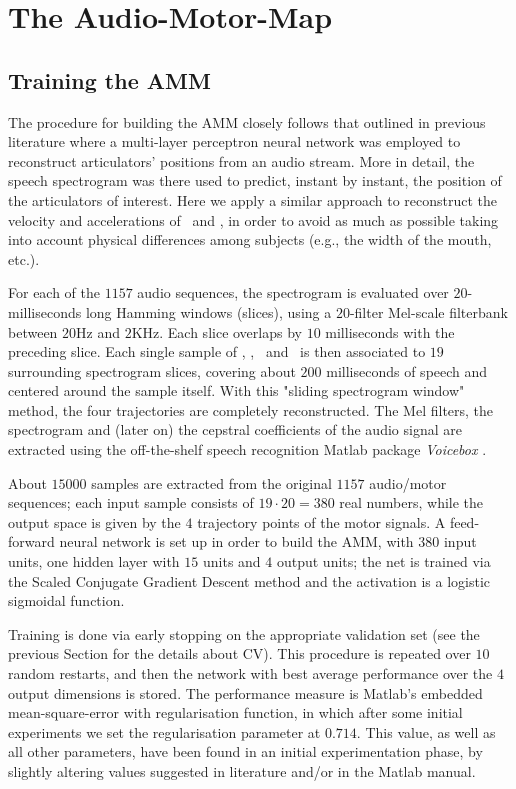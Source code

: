 \section{The Audio-Motor-Map}
\label{sec:rec}

\subsection{Training the AMM}
\label{subsec:amm_setup}

The procedure for building the AMM closely follows that outlined in previous
literature \cite{papcun,richmond,richmond2007} where a multi-layer perceptron
neural network was employed to reconstruct articulators' positions from an
audio stream. More in detail, the speech spectrogram was there used to predict,
instant by instant, the position of the articulators of interest. Here we apply
a similar approach to reconstruct the velocity and accelerations of \lio\ and \ttu,
in order to avoid as much as possible taking into account physical differences
among subjects (e.g., the width of the mouth, etc.).

For each of the $1157$ audio sequences, the spectrogram is evaluated
over $20$-milliseconds long Hamming windows (slices), using a $20$-filter
Mel-scale filterbank between $20$Hz and $2$KHz. Each slice overlaps by $10$ milliseconds with
the preceding slice. Each single sample of \vlio, \alio, \vttu\ and \attu\ is
then associated to $19$ surrounding spectrogram slices, covering
about $200$ milliseconds of speech and centered around the sample itself. With this
"sliding spectrogram window" method, the four trajectories are completely reconstructed.
The Mel filters, the spectrogram and (later on) the cepstral coefficients of the audio
signal are extracted using the off-the-shelf speech recognition Matlab package
\emph{Voicebox} \cite{Brookes1997}.

About $15000$ samples are extracted from the original $1157$
audio/motor sequences; each input sample consists of $19\cdot 20 = 380$ real
numbers, while the output space is given by the $4$ trajectory points of
the motor signals. A feed-forward neural network is set up in order to
build the AMM, with $380$ input units, one hidden layer with $15$ units and
$4$ output units; the net is trained via the Scaled Conjugate Gradient
Descent method \cite{MOLLER93} and the activation is a logistic sigmoidal function.

Training is done via early stopping on the appropriate validation set (see the previous
Section for the details about CV). This procedure is repeated over $10$ random restarts, and then
the network with best average performance over the $4$ output dimensions is stored.
The performance measure is Matlab's embedded mean-square-error with regularisation
function, in which after some initial experiments we set the regularisation
parameter at $0.714$. This value, as well as all other parameters, have been found in
an initial experimentation phase, by slightly altering values suggested in literature
and/or in the Matlab manual.

